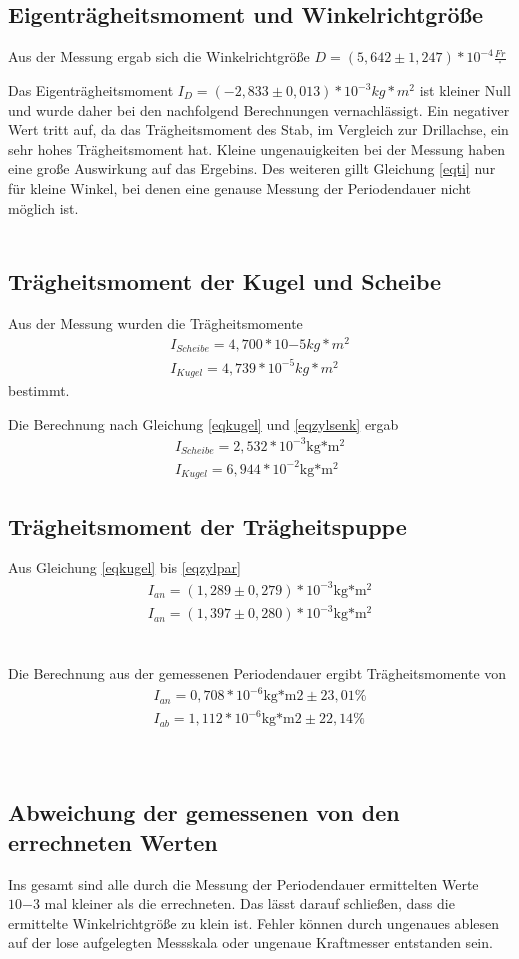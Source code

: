 \subsection{Eigenträgheitsmoment und Winkelrichtgröße}
Aus der Messung ergab sich die Winkelrichtgröße
$D=(5,642\pm1,247)*10^{-4}\frac{Fr}{^{\circ}}$


Das Eigenträgheitsmoment
$I_{D}=(-2,833\pm 0,013)*10^{-3}kg*m^2$
ist kleiner Null und wurde daher bei den nachfolgend Berechnungen vernachlässigt. Ein negativer Wert tritt auf, da das Trägheitsmoment des Stab, im Vergleich zur Drillachse, ein sehr hohes Trägheitsmoment hat. Kleine ungenauigkeiten bei der Messung haben eine große Auswirkung auf das Ergebins. Des weiteren gillt Gleichung \ref{eqti} nur für kleine Winkel, bei denen eine genause Messung der Periodendauer nicht möglich ist.
\\
\\
\subsection{Trägheitsmoment der Kugel und Scheibe}
Aus der Messung wurden die Trägheitsmomente
\begin{align*}
I_{Scheibe}=4,700*10{-5}kg*m^2\\
I_{Kugel}=4,739*10^{-5}kg*m^2
\end{align*}
bestimmt.


Die Berechnung nach Gleichung \ref{eqkugel} und \ref{eqzylsenk} ergab
\begin{align*}
I_{Scheibe}=2,532*10^{-3}\text{kg*m$^2$}\\
I_{Kugel}=6,944*10^{-2}\text{kg*m$^2$}
\end{align*}

\subsection{Trägheitsmoment der Trägheitspuppe}
Aus Gleichung \ref{eqkugel} bis \ref{eqzylpar}
\begin{align*}
I_{an}=(1,289\pm0,279)*10^{-3}\text{kg*m$^2$}\\
I_{an}=(1,397\pm0,280)*10^{-3}\text{kg*m$^2$}
\end{align*}
\\
\\
Die Berechnung aus der gemessenen Periodendauer ergibt Trägheitsmomente von
\begin{align*}
I_{an}=0,708*10^{-6}\text{kg*m2}\pm23,01\%\\
I_{ab}=1,112*10^{-6}\text{kg*m2}\pm22,14\%
\end{align*}
\\
\\
\subsection{Abweichung der gemessenen von den errechneten Werten}
Ins gesamt sind alle durch die Messung der Periodendauer ermittelten Werte $10{-3}$ mal kleiner als die errechneten. Das lässt darauf schließen, dass die ermittelte Winkelrichtgröße zu klein ist.
Fehler können durch ungenaues ablesen auf der lose aufgelegten Messskala oder ungenaue Kraftmesser entstanden sein.